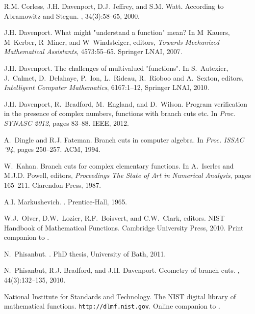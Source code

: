 \documentclass{llncs}
\begin{document}
\begin{thebibliography}{10}
R.M. Corless, J.H. Davenport, D.J. Jeffrey, and S.M. Watt.
\newblock According to {A}bramowitz and {S}tegun.
, 34(3):58--65, 2000.

J.H. Davenport.
\newblock What might "understand a function" mean?
\newblock In M~Kauers, M~Kerber, R~Miner, and W~Windsteiger, editors, {\em
  Towards Mechanized Mathematical Assistants}, 4573:55--65.
  Springer LNAI, 2007.

J.H. Davenport.
\newblock The challenges of multivalued "functions".
\newblock In S.~Autexier, J.~Calmet, D.~Delahaye, P.~Ion, L.~Rideau, R.~Rioboo and A.~Sexton, editors, 
{\em Intelligent Computer Mathematics}, 6167:1--12, Springer LNAI, 2010.

J.H. Davenport, R.~Bradford, M.~England, and D.~Wilson.
\newblock Program verification in the presence of complex numbers, functions
  with branch cuts etc.
\newblock In {\em Proc. SYNASC 2012}, pages 83--88. IEEE, 2012.

A.~Dingle and R.J. Fateman.
\newblock Branch cuts in computer algebra.
\newblock In {\em Proc. ISSAC '94}, pages 250--257. ACM, 1994.

W.~Kahan.
\newblock Branch cuts for complex elementary functions.
\newblock In A.~Iserles and M.J.D. Powell, editors, {\em Proceedings The State
  of Art in Numerical Analysis}, pages 165--211. Clarendon Press, 1987.

A.I. Markushevich.
.
\newblock Prentice-Hall, 1965.

W.J.~Olver, D.W.~Lozier, R.F.~Boisvert, and C.W.~Clark, editors.
NIST Handbook of Mathematical Functions.
Cambridge University Press, 2010.
Print companion to \cite{NIST}.

N.~Phisanbut.
.
\newblock PhD thesis, University of {B}ath, 2011.

N.~Phisanbut, R.J. Bradford, and J.H. Davenport.
\newblock Geometry of branch cuts.
, 44(3):132--135, 2010.

{National Institute for Standards and Technology}. {T}he {NIST} digital library
  of mathematical functions.
\newblock \texttt{http://dlmf.nist.gov}.
Online companion to \cite{OLBC2010}.

\end{thebibliography}
\end{document}
